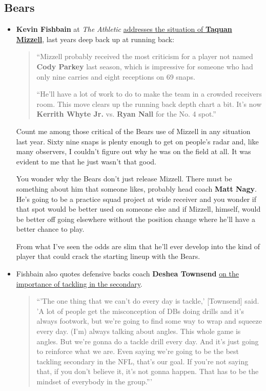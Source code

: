 \documentclass[11pt]{article}
\author{Tom Shannon}
\date{\today}
\title{}
\begin{document}
\subsection{Bears}
\begin{itemize}
\item  \textbf{Kevin Fishbain} at \emph{The Athletic} \href{https://theathletic.com/990751/2019/05/22/ota-takeaways-the-bears-arent-hibernating-as-the-defending-nfc-north-champs-show-up-at-halas-hall/}{addresses the situation of \textbf{Taquan Mizzell}}, last years deep back up at running back:

\begin{quote}
``Mizzell probably received the most criticism for a player not named \textbf{Cody Parkey} last season, which is impressive for someone who had only nine carries and eight receptions on 69 snaps. 

``He’ll have a lot of work to do to make the team in a crowded receivers room. This move clears up the running back depth chart a bit. It’s now \textbf{Kerrith Whyte Jr.} vs. \textbf{Ryan Nall} for the No. 4 spot.''
\end{quote}

Count me among those critical of the Bears use of Mizzell in any situation last year.  Sixty nine snaps is plenty enough to get on people's radar and, like many observers, I couldn't figure out why he was on the field at all.  It was evident to me that he just wasn't that good.

You wonder why the Bears don’t just release Mizzell. There must be something about him that someone likes, probably head coach \textbf{Matt Nagy}. He’s going to be a practice squad project at wide receiver and you wonder if that spot would be better used on someone else and if Mizzell, himself, would be better off going elsewhere without the position change where he’ll have a better chance to play.

From what I've seen the odds are slim that he'll ever develop into the kind of player that could crack the starting lineup with the Bears.

\item Fishbain also quotes defensive backs coach \textbf{Deshea Townsend} \href{https://theathletic.com/990751/2019/05/22/ota-takeaways-the-bears-arent-hibernating-as-the-defending-nfc-north-champs-show-up-at-halas-hall/}{on the importance of tackling in the secondary}. 

\begin{quote}
``'The one thing that we can’t do every day is tackle,' [Townsend] said. 'A lot of people get the misconception of DBs doing drills and it’s always footwork, but we’re going to find some way to wrap and squeeze every day.  (I’m) always talking about angles. This whole game is angles. But we’re gonna do a tackle drill every day. And it’s just going to reinforce what we are. Even saying we’re going to be the best tackling secondary in the NFL, that’s our goal. If you’re not saying that, if you don’t believe it, it’s not gonna happen. That has to be the mindset of everybody in the group.'''
\end{quote}


\end{itemize}
\end{document}
